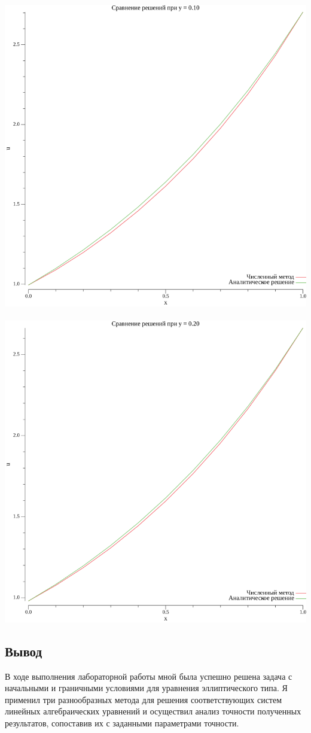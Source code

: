 \documentclass{article}
\begin{document}
\\
\includegraphics[scale=0.6]{2plot_y_0.10.png}
\\

\\
\includegraphics[scale=0.6]{2plot_y_0.20.png}
\\

\subsection*{Вывод}

В ходе выполнения лабораторной работы мной была успешно решена задача с начальными и граничными условиями для уравнения эллиптического типа. 
Я применил три разнообразных метода для решения соответствующих систем линейных алгебраических уравнений и осуществил анализ точности полученных результатов, 
сопоставив их с заданными параметрами точности.
\end{document}
